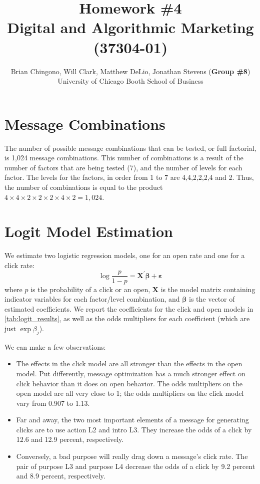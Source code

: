 



\title{Homework \#4\\
Digital and Algorithmic Marketing (37304-01)}
\author{
Brian Chingono, Will Clark, Matthew DeLio, Jonathan Stevens (\textbf{Group \#8})\\
University of Chicago Booth School of Business}

\maketitle

\section{Message Combinations} %

The number of possible message combinations that can be tested, or full factorial, is 1,024 message combinations. This number of combinations is a result of the number of factors that are being tested (7), and the number of levels for each factor.  The levels for the factors, in order from 1 to 7 are 4,4,2,2,2,4 and 2.  Thus, the number of combinations is equal to the product $4\times4\times2\times2\times2\times4\times2 = 1,024$.    

\section{Logit Model Estimation} %

We estimate two logistic regression models, one for an open rate and one for a click rate:
\[ \log{\frac{p}{1-p}} = \bm{X}^{\prime} \bm{\beta} + \bm{\varepsilon} \]
where $p$ is the probability of a click or an open, $\bm{X}$ is the model matrix containing indicator variables for each factor/level combination, and $\bm{\beta}$ is the vector of estimated coefficients. We report the coefficients for the click and open models in \cref{tab:logit_results}, as well as the odds multipliers for each coefficient (which are just $\exp{\beta_j}$).

We can make a few observations:
\begin{itemize}
\item The effects in the click model are all stronger than the effects in the open model. Put differently, message optimization has a much stronger effect on click behavior than it does on open behavior. The odds multipliers on the open model are all very close to 1; the odds multipliers on the click model vary from 0.907 to 1.13.
\item Far and away, the two most important elements of a message for generating clicks are to use \textsf{action L2} and \textsf{intro L3}. They increase the odds of a click by 12.6 and 12.9 percent, respectively.
\item Conversely, a bad \textsf{purpose} will really drag down a message's click rate. The pair of \textsf{purpose L3} and \textsf{purpose L4} decrease the odds of a click by 9.2 percent and 8.9 percent, respectively.
\end{itemize}

